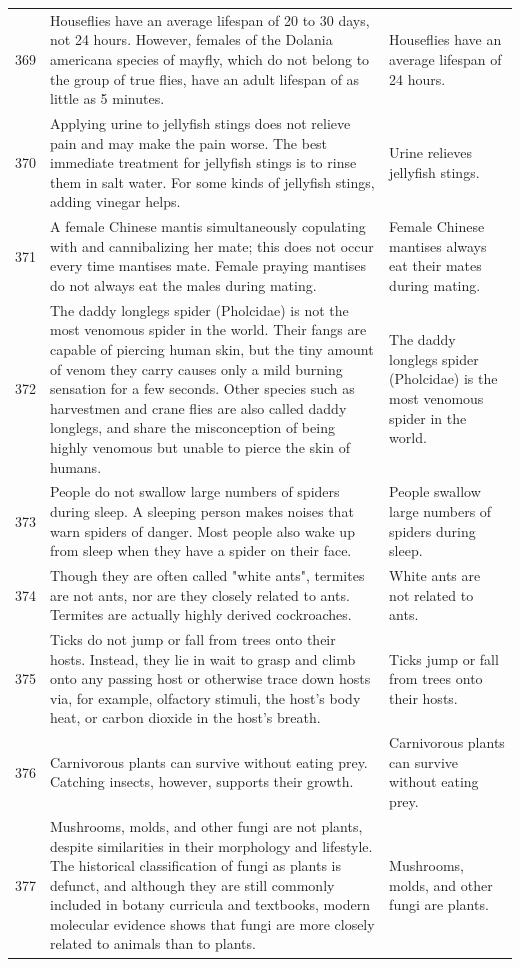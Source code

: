 \begin{tabular}{c|p{}|p{}}
369 & Houseflies have an average lifespan of 20 to 30 days, not 24 hours. However, females of the Dolania americana species of mayfly, which do not belong to the group of true flies, have an adult lifespan of as little as 5 minutes. & Houseflies have an average lifespan of 24 hours. \\
370 & Applying urine to jellyfish stings does not relieve pain and may make the pain worse. The best immediate treatment for jellyfish stings is to rinse them in salt water. For some kinds of jellyfish stings, adding vinegar helps. & Urine relieves jellyfish stings. \\
371 & A female Chinese mantis simultaneously copulating with and cannibalizing her mate; this does not occur every time mantises mate. Female praying mantises do not always eat the males during mating. & Female Chinese mantises always eat their mates during mating. \\
372 & The daddy longlegs spider (Pholcidae) is not the most venomous spider in the world. Their fangs are capable of piercing human skin, but the tiny amount of venom they carry causes only a mild burning sensation for a few seconds. Other species such as harvestmen and crane flies are also called daddy longlegs, and share the misconception of being highly venomous but unable to pierce the skin of humans. & The daddy longlegs spider (Pholcidae) is the most venomous spider in the world. \\
373 & People do not swallow large numbers of spiders during sleep. A sleeping person makes noises that warn spiders of danger. Most people also wake up from sleep when they have a spider on their face. & People swallow large numbers of spiders during sleep. \\
374 & Though they are often called "white ants", termites are not ants, nor are they closely related to ants. Termites are actually highly derived cockroaches. & White ants are not related to ants. \\
375 & Ticks do not jump or fall from trees onto their hosts. Instead, they lie in wait to grasp and climb onto any passing host or otherwise trace down hosts via, for example, olfactory stimuli, the host's body heat, or carbon dioxide in the host's breath. & Ticks jump or fall from trees onto their hosts. \\
376 & Carnivorous plants can survive without eating prey. Catching insects, however, supports their growth. & Carnivorous plants can survive without eating prey. \\
377 & Mushrooms, molds, and other fungi are not plants, despite similarities in their morphology and lifestyle. The historical classification of fungi as plants is defunct, and although they are still commonly included in botany curricula and textbooks, modern molecular evidence shows that fungi are more closely related to animals than to plants. & Mushrooms, molds, and other fungi are plants. \\

\end{tabular}
